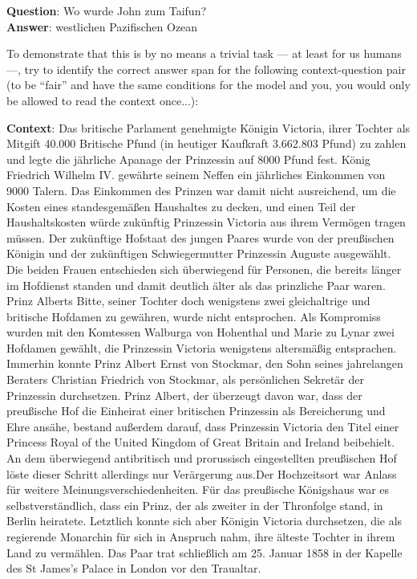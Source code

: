 \begin{examples}
       \textbf{Question}: Wo wurde John zum Taifun?\\
       \textbf{Answer}: westlichen Pazifischen Ozean
\end{examples}

To demonstrate that this is by no means a trivial task --- at least for us humans ---, try to
identify the correct answer span for the following context-question pair (to be ``fair'' and have the same conditions
for the model and you, you would only be allowed to read the context once...):

\begin{examples}
    \item \textbf{Context}:
        Das britische Parlament genehmigte Königin Victoria, ihrer Tochter
        als Mitgift 40.000 Britische Pfund (in heutiger Kaufkraft 3.662.803 Pfund) zu
        zahlen und legte die jährliche Apanage der Prinzessin auf 8000 Pfund fest.
        König Friedrich Wilhelm IV. gewährte seinem Neffen ein jährliches Einkommen
        von 9000 Talern. Das Einkommen des Prinzen war damit nicht ausreichend, um
        die Kosten eines standesgemäßen Haushaltes zu decken, und einen Teil der
        Haushaltskosten würde zukünftig Prinzessin Victoria aus ihrem Vermögen tragen
        müssen. Der zukünftige Hofstaat des jungen Paares wurde von der preußischen
        Königin und der zukünftigen Schwiegermutter Prinzessin Auguste ausgewählt. Die
        beiden Frauen entschieden sich überwiegend für Personen, die bereits länger
        im Hofdienst standen und damit deutlich älter als das prinzliche Paar waren.
        Prinz Alberts Bitte, seiner Tochter doch wenigstens zwei gleichaltrige und
        britische Hofdamen zu gewähren, wurde nicht entsprochen. Als Kompromiss wurden
        mit den Komtessen Walburga von Hohenthal und Marie zu Lynar zwei Hofdamen
        gewählt, die Prinzessin Victoria wenigstens altersmäßig entsprachen. Immerhin
        konnte Prinz Albert Ernst von Stockmar, den Sohn seines jahrelangen Beraters
        Christian Friedrich von Stockmar, als persönlichen Sekretär der Prinzessin
        durchsetzen. Prinz Albert, der überzeugt davon war, dass der preußische Hof
        die Einheirat einer britischen Prinzessin als Bereicherung und Ehre ansähe,
        bestand außerdem darauf, dass Prinzessin Victoria den Titel einer Princess
        Royal of the United Kingdom of Great Britain and Ireland beibehielt. An dem
        überwiegend antibritisch und prorussisch eingestellten preußischen Hof löste
        dieser Schritt allerdings nur Verärgerung aus.Der Hochzeitsort war Anlass
        für weitere Meinungsverschiedenheiten. Für das preußische Königshaus war es
        selbstverständlich, dass ein Prinz, der als zweiter in der Thronfolge stand,
        in Berlin heiratete. Letztlich konnte sich aber Königin Victoria durchsetzen,
        die als regierende Monarchin für sich in Anspruch nahm, ihre älteste Tochter
        in ihrem Land zu vermählen. Das Paar trat schließlich am 25. Januar 1858 in
        der Kapelle des St James’s Palace in London vor den Traualtar.


\end{examples}
